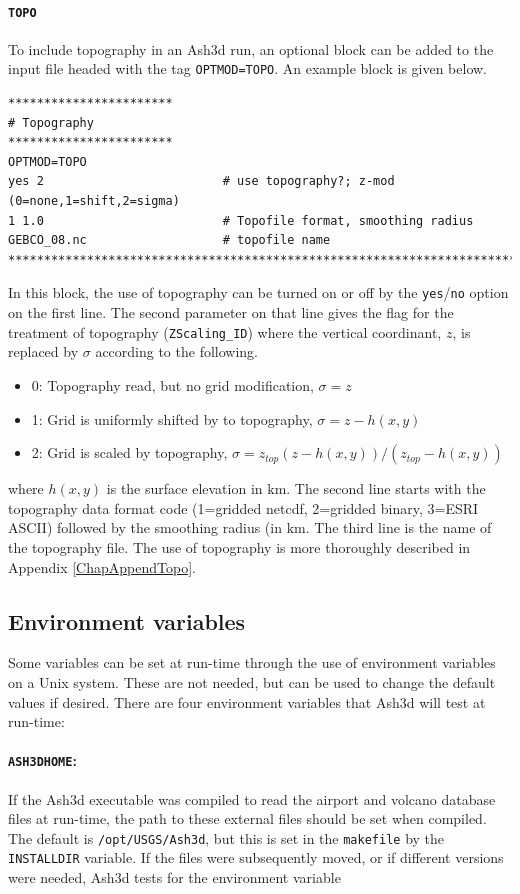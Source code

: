 \paragraph{\texttt{TOPO}}
To include topography in an Ash3d run, an optional block can be added to the
input file headed with the tag \texttt{OPTMOD=TOPO}.
An example block is given below.
\small
\begin{verbatim}
***********************
# Topography
***********************
OPTMOD=TOPO
yes 2                         # use topography?; z-mod (0=none,1=shift,2=sigma)
1 1.0                         # Topofile format, smoothing radius
GEBCO_08.nc                   # topofile name
*******************************************************************************
\end{verbatim}
\normalsize
In this block, the use of topography can be turned on or off by the
\texttt{yes}/\texttt{no} option on the first line. The second parameter on that
line gives the flag for the treatment of topography (\texttt{ZScaling\_ID})
where the vertical coordinant, $z$, is replaced by $\sigma$ according to the following.
\begin{itemize}
 \item 0: Topography read, but no grid modification, $\sigma=z$
 \item 1: Grid is uniformly shifted by to topography, $\sigma=z-h(x,y)$
 \item 2: Grid is scaled by topography, $\sigma=z_{top}(z-h(x,y))/(z_{top}-h(x,y))$
\end{itemize}
where $h(x,y)$ is the surface elevation in $\mathrm{km}$.
The second line starts with the topography data format code
(1=gridded netcdf, 2=gridded binary, 3=ESRI ASCII) followed by the smoothing
radius (in $\mathrm{km}$.
The third line is the name of the topography file. The use of topography is
more thoroughly described in Appendix \ref{ChapAppendTopo}.

\subsection{Environment variables}
Some variables can be set at run-time through the use of environment variables on a Unix
system. These are not needed, but can be used to change the default values if desired.
There are four environment variables that Ash3d will test at run-time:


\paragraph{\texttt{ASH3DHOME}:}
If the Ash3d executable was compiled to read the
airport and volcano database files at
run-time, the path to these external files should be set when compiled. The default is
\texttt{/opt/USGS/Ash3d}, but this is set in the \texttt{makefile} by the \texttt{INSTALLDIR}
variable. If the files were subsequently moved, or if different versions were needed,
Ash3d tests for the environment variable 

